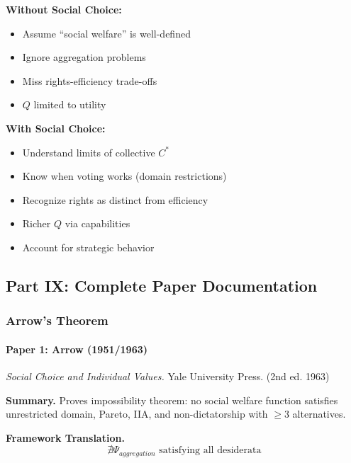 \textbf{Without Social Choice:}
\begin{itemize}
    \item Assume ``social welfare'' is well-defined
    \item Ignore aggregation problems
    \item Miss rights-efficiency trade-offs
    \item $Q$ limited to utility
\end{itemize}

\textbf{With Social Choice:}
\begin{itemize}
    \item Understand limits of collective $C^*$
    \item Know when voting works (domain restrictions)
    \item Recognize rights as distinct from efficiency
    \item Richer $Q$ via capabilities
    \item Account for strategic behavior
\end{itemize}

\subsection{Part IX: Complete Paper Documentation}

\subsubsection{Arrow's Theorem}

\paragraph{Paper 1: Arrow (1951/1963)}

\textit{Social Choice and Individual Values.}
Yale University Press. (2nd ed. 1963)

\textbf{Summary.}
Proves impossibility theorem: no social welfare function satisfies unrestricted 
domain, Pareto, IIA, and non-dictatorship with $\geq 3$ alternatives.

\textbf{Framework Translation.}
\begin{equation}
\nexists \Psi_{aggregation} \text{ satisfying all desiderata}
\end{equation}

